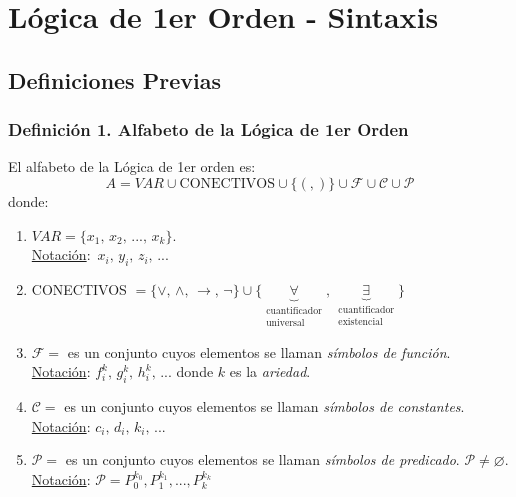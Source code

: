 \documentclass{article}
\newcommand{\comma}{,\,}                                %
\newcommand{\partes}{\mathcal{P}}
\newcommand{\familia}{\mathcal{F}}                      %
\newcommand{\ctes}{\mathcal{C}}
\begin{document}
\newpage
\section{Lógica de 1er Orden - Sintaxis}
\subsection{Definiciones Previas}
\subsubsection*{Definición 1. Alfabeto de la Lógica de 1er Orden}
El alfabeto de la Lógica de 1er orden es:
\begin{equation*}
    A = VAR \cup \text{CONECTIVOS} \cup \{ ( , ) \} \cup \familia \cup \ctes \cup \partes
\end{equation*}
donde:
\begin{enumerate}
    \item $VAR = \{ x_1 \comma x_2 \comma ... \comma x_k \}$. \\\underline{Notación}:~$x_i \comma y_i \comma z_i \comma ...$
    \item CONECTIVOS $= \{ \vee \comma \wedge \comma \rightarrow \comma \neg \} \cup \{ \underbrace{\forall}_{\substack{\text{cuantificador}\\\text{universal}}} \comma \underbrace{\exists}_{\substack{\text{cuantificador}\\\text{existencial}}} \}$ 
    \item $\familia = $ es un conjunto cuyos elementos se llaman \emph{símbolos de función}. 
    \\\underline{Notación}: $f_i^k \comma g_i^k \comma h_i^k \comma ...$ donde $k$ es la \emph{ariedad}.
    \item $\ctes = $ es un conjunto cuyos elementos se llaman \emph{símbolos de constantes}.
    \\\underline{Notación}: $c_i \comma d_i \comma k_i \comma ...$ 
    \item $\partes = $ es un conjunto cuyos elementos se llaman \emph{símbolos de predicado}. $\partes \neq \varnothing$.
    \\\underline{Notación}: $\partes = { P_0^{k_0}, P_1^{k_1}, ... , P_k^{k_k}}$
\end{enumerate}
\end{document}
